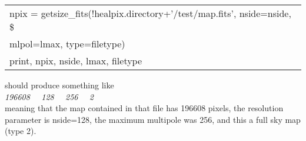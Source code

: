 \begin{example}
{
\begin{tabular}{l} %
 npix = getsize\_fits(!healpix.directory+'/test/map.fits', nside=nside, \$ \\
\hspace{1em}       mlpol=lmax, type=filetype)\\
 print, npix, nside, lmax, filetype
\end{tabular}
}
{\parbox[t]{\hsize}{ should produce something like \\
   {\em 196608 \ \        128 \ \         256  \ \      2} \\
meaning that the map contained in that file has 196608 pixels, the resolution parameter is
nside=128, the maximum multipole was 256, and this a full sky map
(type 2).
}}
\end{example}

